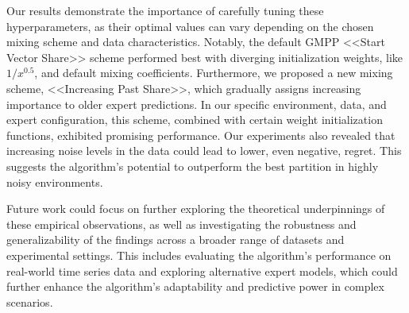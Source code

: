 \documentclass[12pt, twoside]{article}
\begin{document}
Our results demonstrate the importance of carefully tuning these hyperparameters, 
as their optimal values can vary depending on the chosen mixing scheme and data characteristics. 
Notably, the default GMPP <<Start Vector Share>> scheme performed best with diverging initialization weights, like $1/x^{0.5}$, and default mixing coefficients. 
Furthermore, we proposed a new mixing scheme, <<Increasing Past Share>>, which gradually assigns increasing importance to older expert predictions. 
In our specific environment, data, and expert configuration, this scheme, combined with certain weight initialization functions, exhibited promising performance. 
Our experiments also revealed that increasing noise levels in the data could lead to lower, even negative, regret. 
This suggests the algorithm's potential to outperform the best partition in highly noisy environments.

Future work could focus on further exploring the theoretical underpinnings of these empirical observations, 
as well as investigating the robustness and generalizability of the findings across a broader range of datasets and experimental settings. 
This includes evaluating the algorithm's performance on real-world time series data and exploring alternative expert models, which could further enhance the algorithm's adaptability and predictive power in complex scenarios.


%
%
\end{document}
